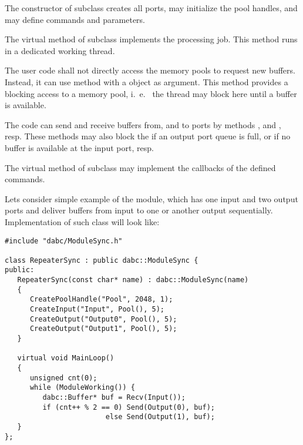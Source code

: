 \begin{compactenum}
\item  The constructor of  subclass  creates all 
      ports, may initialize the pool handles, and may 
      define commands and parameters. 
\item  The virtual  method of  
      subclass implements the processing job. This method runs in a dedicated working thread.  
\item  The user code shall not directly access the 
      memory pools to request new buffers. Instead, it can use  method 
       with a  object as argument.
      This method provides a blocking access to a memory pool, i.~e.~ the  
      thread may block here until a buffer is available.
\item  The  code can send and receive buffers   
      from, and to ports by  methods , and
    , resp. These methods may also block the  if an output port queue is full, or if no buffer is available at the input port, resp.
\item  The virtual  method of  
      subclass may implement the callbacks of the defined commands.
\end{compactenum}

Lets consider simple example of the module, 
which has one input and two output ports and deliver buffers from input to
one or another output sequentially. Implementation of such 
class will look like:
\begin{small}
\begin{verbatim}
#include "dabc/ModuleSync.h"

class RepeaterSync : public dabc::ModuleSync {
public:
   RepeaterSync(const char* name) : dabc::ModuleSync(name)
   {
      CreatePoolHandle("Pool", 2048, 1);
      CreateInput("Input", Pool(), 5);
      CreateOutput("Output0", Pool(), 5);
      CreateOutput("Output1", Pool(), 5);
   }
     
   virtual void MainLoop()
   {
      unsigned cnt(0);
      while (ModuleWorking()) {
         dabc::Buffer* buf = Recv(Input());
         if (cnt++ % 2 == 0) Send(Output(0), buf);
                        else Send(Output(1), buf);
   }
};
\end{verbatim}
\end{small}

